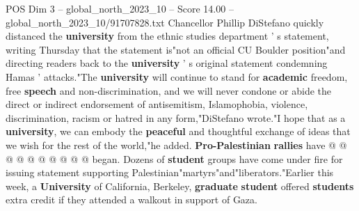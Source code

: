 \begin{textsample}{POS Dim 3 – global\_north\_2023\_10 – Score 14.00 – global\_north\_2023\_10/91707828.txt}
Chancellor Phillip DiStefano quickly distanced the \textbf{university} from the ethnic studies department ' s statement, writing Thursday that the statement is"not an official CU Boulder position"and directing readers back to the \textbf{university} ' s original statement condemning Hamas ' attacks."The \textbf{university} will continue to stand for \textbf{academic} freedom, free \textbf{speech} and non-discrimination, and we will never condone or abide the direct or indirect endorsement of antisemitism, Islamophobia, violence, discrimination, racism or hatred in any form,"DiStefano wrote."I hope that as a \textbf{university}, we can embody the \textbf{peaceful} and thoughtful exchange of ideas that we wish for the rest of the world,"he added. \textbf{Pro-Palestinian} \textbf{rallies} have @ @ @ @ @ @ @ @ @ @ began.
Dozens of \textbf{student} groups have come under fire for issuing statement supporting Palestinian"martyrs"and"liberators."Earlier this week, a \textbf{University} of California, Berkeley, \textbf{graduate} \textbf{student} offered \textbf{students} extra credit if they attended a walkout in support of Gaza.

\end{textsample}
